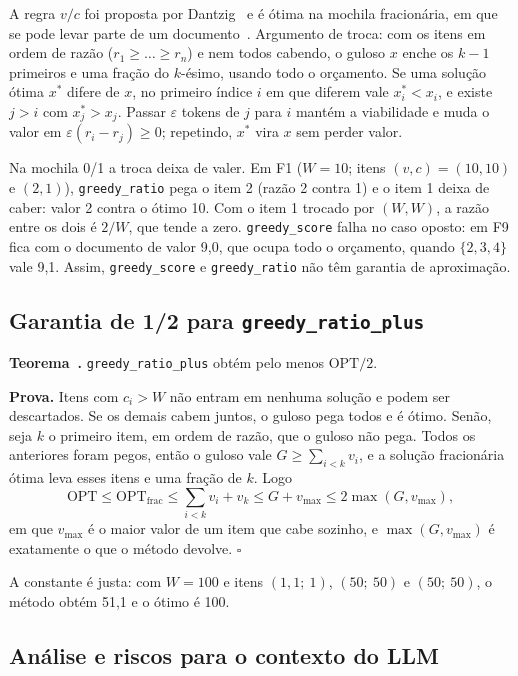 A regra $v/c$ foi proposta por Dantzig~\cite{dantzig1957} e é ótima na
mochila fracionária, em que se pode levar parte de um
documento~\cite{cormen2012}. Argumento de troca: com os itens em ordem de razão
($r_1 \ge \dots \ge r_n$) e nem todos cabendo, o guloso $x$ enche os $k-1$
primeiros e uma fração do $k$-ésimo, usando todo o orçamento. Se uma solução
ótima $x^*$ difere de $x$, no primeiro índice $i$ em que diferem vale
$x^*_i < x_i$, e existe $j > i$ com $x^*_j > x_j$. Passar $\varepsilon$ tokens
de $j$ para $i$ mantém a viabilidade e muda o valor em
$\varepsilon(r_i - r_j) \ge 0$; repetindo, $x^*$ vira $x$ sem perder valor.

Na mochila 0/1 a troca deixa de valer. Em F1 ($W = 10$; itens
$(v, c) = (10, 10)$ e $(2, 1)$), \texttt{greedy\_ratio} pega o item 2 (razão 2
contra 1) e o item 1 deixa de caber: valor 2 contra o ótimo 10. Com o item 1
trocado por $(W, W)$, a razão entre os dois é $2/W$, que tende a zero.
\texttt{greedy\_score} falha no caso oposto: em F9 fica com o documento de
valor 9{,}0, que ocupa todo o orçamento, quando $\{2, 3, 4\}$ vale 9{,}1.
Assim, \texttt{greedy\_score} e \texttt{greedy\_ratio} não têm garantia de
aproximação.

\subsection{Garantia de 1/2 para \texttt{greedy\_ratio\_plus}}

\textbf{Teorema~\cite{kellerer2004}.} \texttt{greedy\_ratio\_plus} obtém pelo menos
$\mathrm{OPT}/2$.

\textbf{Prova.} Itens com $c_i > W$ não entram em nenhuma solução e podem ser
descartados. Se os demais cabem juntos, o guloso pega todos e é ótimo. Senão,
seja $k$ o primeiro item, em ordem de razão, que o guloso não pega. Todos os
anteriores foram pegos, então o guloso vale $G \ge \sum_{i<k} v_i$, e a solução
fracionária ótima leva esses itens e uma fração de $k$. Logo
\[
  \mathrm{OPT} \le \mathrm{OPT}_{\text{frac}} \le \sum_{i<k} v_i + v_k
  \le G + v_{\max} \le 2\max(G, v_{\max}),
\]
em que $v_{\max}$ é o maior valor de um item que cabe sozinho, e
$\max(G, v_{\max})$ é exatamente o que o método devolve. \hfill$\square$

A constante é justa: com $W = 100$ e itens $(1{,}1;\ 1)$, $(50;\ 50)$ e
$(50;\ 50)$, o método obtém 51{,}1 e o ótimo é 100.

\subsection{Análise e riscos para o contexto do LLM}

